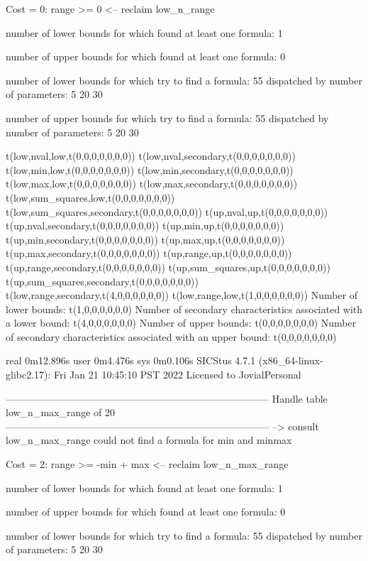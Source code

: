 Cost =  0:  range >= 0
<-- reclaim low_n_range

number of lower bounds for which found at least one formula: 1

number of upper bounds for which found at least one formula: 0

number of lower bounds for which try to find a formula: 55
dispatched by number of parameters: 5  20  30

number of upper bounds for which try to find a formula: 55
dispatched by number of parameters: 5  20  30

t(low,nval,low,t(0,0,0,0,0,0,0))
t(low,nval,secondary,t(0,0,0,0,0,0,0))
t(low,min,low,t(0,0,0,0,0,0,0))
t(low,min,secondary,t(0,0,0,0,0,0,0))
t(low,max,low,t(0,0,0,0,0,0,0))
t(low,max,secondary,t(0,0,0,0,0,0,0))
t(low,sum_squares,low,t(0,0,0,0,0,0,0))
t(low,sum_squares,secondary,t(0,0,0,0,0,0,0))
t(up,nval,up,t(0,0,0,0,0,0,0))
t(up,nval,secondary,t(0,0,0,0,0,0,0))
t(up,min,up,t(0,0,0,0,0,0,0))
t(up,min,secondary,t(0,0,0,0,0,0,0))
t(up,max,up,t(0,0,0,0,0,0,0))
t(up,max,secondary,t(0,0,0,0,0,0,0))
t(up,range,up,t(0,0,0,0,0,0,0))
t(up,range,secondary,t(0,0,0,0,0,0,0))
t(up,sum_squares,up,t(0,0,0,0,0,0,0))
t(up,sum_squares,secondary,t(0,0,0,0,0,0,0))
t(low,range,secondary,t(4,0,0,0,0,0,0))
t(low,range,low,t(1,0,0,0,0,0,0))
Number of lower bounds:                                             t(1,0,0,0,0,0,0)
Number of secondary characteristics associated with a lower bound:  t(4,0,0,0,0,0,0)
Number of upper bounds:                                             t(0,0,0,0,0,0,0)
Number of secondary characteristics associated with an upper bound: t(0,0,0,0,0,0,0)

real	0m12.896s
user	0m4.476s
sys	0m0.106s
SICStus 4.7.1 (x86_64-linux-glibc2.17): Fri Jan 21 10:45:10 PST 2022
Licensed to JovialPersonal


--------------------------------------------------------------------------------
Handle table low_n_max_range of 20
--------------------------------------------------------------------------------
--> consult low_n_max_range
could not find a formula for min and minmax

Cost =  2:  range >= -min + max
<-- reclaim low_n_max_range

number of lower bounds for which found at least one formula: 1

number of upper bounds for which found at least one formula: 0

number of lower bounds for which try to find a formula: 55
dispatched by number of parameters: 5  20  30

